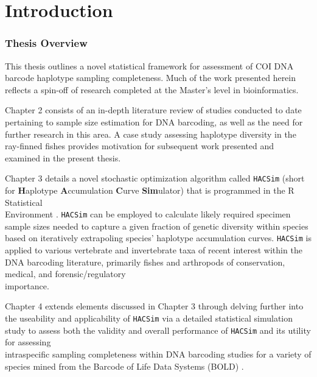 \linespread{1.0}

\chapter{Introduction}
\subsection{Thesis Overview} \label{sec:intro1}

This thesis outlines a novel statistical framework for assessment of COI DNA barcode haplotype sampling completeness. Much of the work presented herein reflects a spin-off of research completed at the Master's level in bioinformatics.

\vspace{5mm}

Chapter 2 consists of an in-depth literature review of studies conducted to date \\ pertaining to sample size estimation for DNA barcoding, as well as the need for further research in this area. A case study assessing haplotype diversity in the ray-finned fishes \cite{phillips2015exploration} provides motivation for subsequent work presented and examined in the present thesis. 

\vspace{5mm}

Chapter 3 details a novel stochastic optimization algorithm called {\tt HACSim} (short for \textbf{H}aplotype \textbf{A}ccumulation \textbf{C}urve \textbf{Sim}ulator) that is programmed in the R Statistical \\ Environment \cite{r2018language}. {\tt HACSim} can be employed to calculate likely required specimen \\ sample sizes needed to capture a given fraction of genetic diversity within species based on iteratively extrapoling species' haplotype accumulation curves. {\tt HACSim} is applied to various vertebrate and invertebrate taxa of recent interest within the DNA barcoding literature, primarily fishes and arthropods of conservation, medical, and forensic/regulatory \\ importance.

\vspace{5mm}

Chapter 4 extends elements discussed in Chapter 3 through delving further into the useability and applicability of {\tt HACSim} via a detailed statistical simulation study to assess both the validity and overall performance of {\tt HACSim} and its utility for assessing \\ intraspecific sampling completeness within DNA barcoding studies for a variety of species mined from the Barcode of Life Data Systems (BOLD) \cite{ratnasingham2007bold}.

